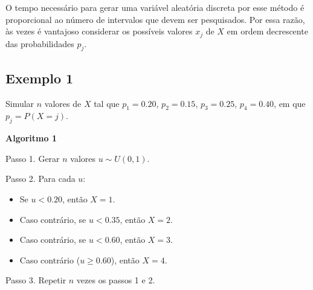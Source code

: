 \documentclass[
  letterpaper,
  DIV=11,
  numbers=noendperiod]{scrreprt}
\begin{document}
\begin{tcolorbox}[enhanced jigsaw, left=2mm, toprule=.15mm, opacityback=0, title=\textcolor{quarto-callout-note-color}{\faInfo}\hspace{0.5em}{Nota}, leftrule=.75mm, breakable, colbacktitle=quarto-callout-note-color!10!white, coltitle=black, rightrule=.15mm, bottomtitle=1mm, toptitle=1mm, colframe=quarto-callout-note-color-frame, colback=white, opacitybacktitle=0.6, bottomrule=.15mm, arc=.35mm, titlerule=0mm]

O tempo necessário para gerar uma variável aleatória discreta por esse
método é proporcional ao número de intervalos que devem ser pesquisados.
Por essa razão, às vezes é vantajoso considerar os possíveis valores
\(x_j\) de \(X\) em ordem decrescente das probabilidades \(p_j\).

\end{tcolorbox}

\subsection*{Exemplo 1}\label{exemplo-1}

Simular \(n\) valores de \(X\) tal que \(p_1 = 0.20\), \(p_2 = 0.15\),
\(p_3 = 0.25\), \(p_4 = 0.40\), em que \(p_j = P(X=j)\).

\begin{tcolorbox}[enhanced jigsaw, left=2mm, rightrule=.15mm, toprule=.15mm, opacityback=0, leftrule=.75mm, colframe=quarto-callout-warning-color-frame, colback=white, breakable, arc=.35mm, bottomrule=.15mm]

\vspace{-3mm}\textbf{Algoritmo 1}\vspace{3mm}

Passo 1. Gerar \(n\) valores \(u \sim U(0,1)\).

Passo 2. Para cada \(u\):

\begin{itemize}
\item
  Se \(u < 0.20\), então \(X = 1\).
\item
  Caso contrário, se \(u < 0.35\), então \(X = 2\).
\item
  Caso contrário, se \(u < 0.60\), então \(X = 3\).
\item
  Caso contrário (\(u \geq 0.60\)), então \(X = 4\).
\end{itemize}

Passo 3. Repetir \(n\) vezes os passos 1 e 2.

\end{tcolorbox}
\end{document}
